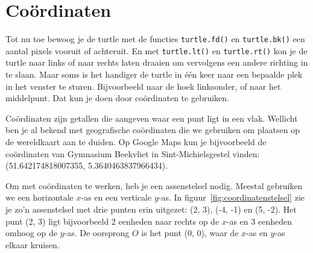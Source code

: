 \documentclass[../main]{subfiles}
\begin{document}
\section{Coördinaten}%
\label{sec:coordinaten}

Tot nu toe bewoog je de turtle met de functies \texttt{turtle.fd()} en \texttt{turtle.bk()} een aantal pixels vooruit of achteruit. En met \texttt{turtle.lt()} en \texttt{turtle.rt()} kon je de turtle naar links of naar rechts laten draaien om vervolgens een andere richting in te slaan. Maar soms is het handiger de turtle in één keer naar een bepaalde plek in het venster te sturen. Bijvoorbeeld naar de hoek linksonder, of naar het middelpunt. Dat kun je doen door coördinaten te gebruiken.

Coördinaten zijn getallen die aangeven waar een punt ligt in een vlak. Wellicht ben je al bekend met geografische coördinaten die we gebruiken om plaatsen op de wereldkaart aan te duiden. Op Google Maps kun je bijvoorbeeld de coördinaten van Gymnasium Beekvliet in Sint-Michielsgestel vinden: (51.642174818007355, 5.3640463837966434).

Om met coördinaten te werken, heb je een assenstelsel nodig. Meestal gebruiken we een horizontale \(x\)-as en een verticale \(y\)-as. In figuur~\ref{fig:coordinatenstelsel} zie je zo'n assenstelsel met drie punten erin uitgezet: (2, 3), (-4, -1) en (5, -2). Het punt (2, 3) ligt bijvoorbeeld 2 eenheden naar rechts op de \(x\)-as en 3 eenheden omhoog op de \(y\)-as. De oorsprong \(O\) is het punt (0, 0), waar de \(x\)-as en \(y\)-as elkaar kruisen.
\end{document}
